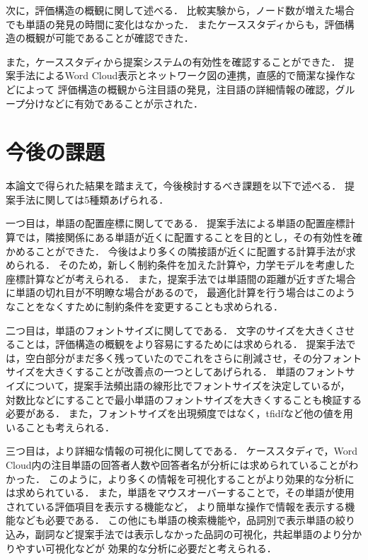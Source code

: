 \documentclass[syuuron]{kuee}
\begin{document}
		次に，評価構造の概観に関して述べる．
		比較実験から，ノード数が増えた場合でも単語の発見の時間に変化はなかった．
		またケーススタディからも，評価構造の概観が可能であることが確認できた．
		
		また，ケーススタディから提案システムの有効性を確認することができた．
		提案手法によるWord Cloud表示とネットワーク図の連携，直感的で簡潔な操作などによって
		評価構造の概観から注目語の発見，注目語の詳細情報の確認，グループ分けなどに有効であることが示された．		
		
	\section{今後の課題}
		本論文で得られた結果を踏まえて，今後検討するべき課題を以下で述べる．
		提案手法に関しては5種類あげられる．
		
		一つ目は，単語の配置座標に関してである．
		提案手法による単語の配置座標計算では，隣接関係にある単語が近くに配置することを目的とし，その有効性を確かめることができた．
		今後はより多くの隣接語が近くに配置する計算手法が求められる．
		そのため，新しく制約条件を加えた計算や，力学モデルを考慮した座標計算などが考えられる．
		また，提案手法では単語間の距離が近すぎた場合に単語の切れ目が不明瞭な場合があるので，
		最適化計算を行う場合はこのようなことをなくすために制約条件を変更することも求められる．
		
		二つ目は，単語のフォントサイズに関してである．
		文字のサイズを大きくさせることは，評価構造の概観をより容易にするためには求められる．
		提案手法では，空白部分がまだ多く残っていたのでこれをさらに削減させ，その分フォントサイズを大きくすることが改善点の一つとしてあげられる．
		単語のフォントサイズについて，提案手法頻出語の線形比でフォントサイズを決定しているが，
		対数比などにすることで最小単語のフォントサイズを大きくすることも検証する必要がある．
		また，フォントサイズを出現頻度ではなく，tfidfなど他の値を用いることも考えられる．		
		
		三つ目は，より詳細な情報の可視化に関してである．
		ケーススタディで，Word Cloud内の注目単語の回答者人数や回答者名が分析には求められていることがわかった．
		このように，より多くの情報を可視化することがより効果的な分析には求められている．
		また，単語をマウスオーバーすることで，その単語が使用されている評価項目を表示する機能など，
		より簡単な操作で情報を表示する機能なども必要である．
		この他にも単語の検索機能や，品詞別で表示単語の絞り込み，副詞など提案手法では表示しなかった品詞の可視化，共起単語のより分かりやすい可視化などが
		効果的な分析に必要だと考えられる．
		
\end{document}
